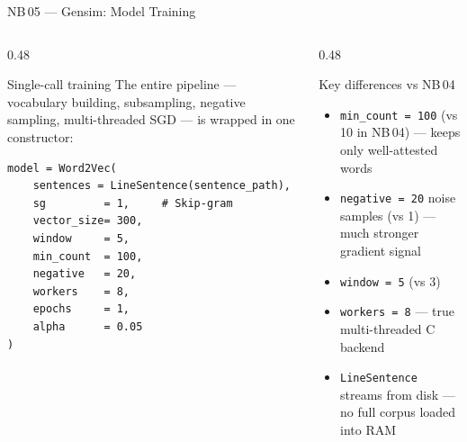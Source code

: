\documentclass[11pt,aspectratio=169,professionalfonts]{beamer}
\begin{document}
%
%
\begin{frame}[fragile]{NB\,05 — Gensim: Model Training}

  \begin{columns}[T]
    \begin{column}{0.48\textwidth}
      \begin{block}{Single-call training}
        The entire pipeline — vocabulary building,
        subsampling, negative sampling, multi-threaded
        SGD — is wrapped in one constructor:
      \end{block}
\scriptsize
\begin{lstlisting}
model = Word2Vec(
    sentences = LineSentence(sentence_path),
    sg         = 1,     # Skip-gram
    vector_size= 300,
    window     = 5,
    min_count  = 100,
    negative   = 20,
    workers    = 8,
    epochs     = 1,
    alpha      = 0.05
)
\end{lstlisting}
    \end{column}
    \begin{column}{0.48\textwidth}
      \begin{block}{Key differences vs NB\,04}
        \begin{itemize}
          \item \texttt{min\_count = 100} (vs 10 in NB\,04)
                — keeps only well-attested words
          \item \texttt{negative = 20} noise samples
                (vs 1) — much stronger gradient signal
          \item \texttt{window = 5} (vs 3)
          \item \texttt{workers = 8} — true
                multi-threaded C backend
          \item \texttt{LineSentence} streams from disk
                — no full corpus loaded into RAM
        \end{itemize}
      \end{block}
    \end{column}
  \end{columns}

\end{frame}
%
%
\end{document}

